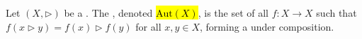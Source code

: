 \begin{definition} \label{definition:automorphism_group_of_a_rack}
Let $(X, \rhd)$ be a . 
The , denoted \hl{$\mathrm{Aut}(X)$}, is the set of all  $f: X \to X$ such that $f(x \rhd y) = f(x) \rhd f(y)$ for all $x, y \in X$, forming a  under composition.
\end{definition}